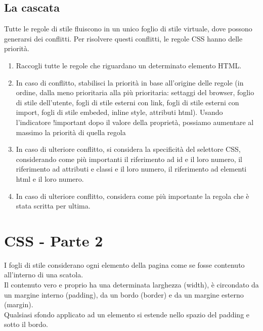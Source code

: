 \documentclass{article}
\begin{document}
\subsection{La cascata}
Tutte le regole di stile fluiscono in un unico foglio di stile virtuale, dove possono generarsi dei conflitti. Per risolvere questi conflitti, le regole CSS hanno delle priorità.
\begin{enumerate}
	\item Raccogli tutte le regole che riguardano un determinato elemento HTML.
	\item In caso di conflitto, stabilisci la priorità in base all'origine delle regole (in ordine, dalla meno prioritaria alla più prioritaria: settaggi del browser, foglio di stile dell'utente, fogli di stile esterni con link, fogli di stile esterni con import, fogli di stile embeded, inline style, attributi html). Usando l'indicatore !important dopo il valore della proprietà, possiamo aumentare al massimo la priorità di quella regola 
	\item In caso di ulteriore conflitto, si considera la specificità del selettore CSS, considerando come più importanti il riferimento ad id e il loro numero, il riferimento ad attributi e classi e il loro numero, il riferimento ad elementi html e il loro numero.
	\item In caso di ulteriore conflitto, considera come più importante la regola che è stata scritta per ultima.
\end{enumerate} 
\section{CSS - Parte 2}
I fogli di stile considerano ogni elemento della pagina come se fosse contenuto all'interno di una scatola.\\
Il contenuto vero e proprio ha una determinata larghezza (width), è circondato da un margine interno (padding), da un bordo (border) e da un margine esterno (margin).\\
Qualsiasi sfondo applicato ad un elemento si estende nello spazio del padding e sotto il bordo.
\end{document}

